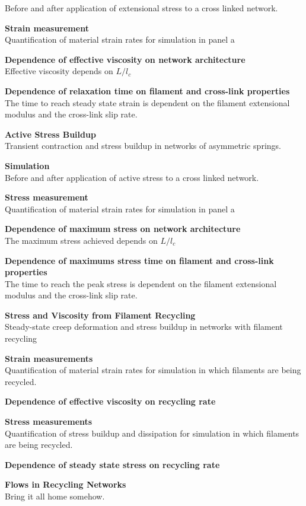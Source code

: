 \documentclass{report}
\begin{document}
\begin{outline}
\begin{outline}
\begin{outline}
\begin{outline}
	   Before and after application of extensional stress to a cross linked network.
	\item {\bf Strain measurement } \\
	   Quantification of material strain rates for simulation in panel a
	\item {\bf Dependence of effective viscosity on network architecture } \\
	   Effective viscosity depends on $L/l_c$ 
	\item {\bf Dependence of relaxation time on filament and cross-link properties } \\
	   The time to reach steady state strain is dependent on the filament extensional modulus and the cross-link slip rate.
      \end{outline}
      \item {\bf Active Stress Buildup } \\
	Transient contraction and stress buildup in networks of asymmetric springs.
      \begin{outline}
	\item {\bf Simulation } \\
	   Before and after application of active stress to a cross linked network.
	\item {\bf Stress measurement } \\
	   Quantification of material strain rates for simulation in panel a
	\item {\bf Dependence of maximum stress on network architecture } \\
	   The maximum stress achieved depends on $L/l_c$ 
	\item {\bf Dependence of maximums stress time on filament and cross-link properties } \\
	   The time to reach the peak stress is dependent on the filament extensional modulus and the cross-link slip rate.
      \end{outline}
      \item {\bf Stress and Viscosity from Filament Recycling} \\
	Steady-state creep deformation and stress buildup in networks with filament recycling
      \begin{outline}
	\item {\bf Strain measurements } \\
	   Quantification of material strain rates for simulation in which filaments are being recycled.
	\item {\bf Dependence of effective viscosity on recycling rate } 
	\item {\bf Stress measurements } \\
	   Quantification of stress buildup and dissipation for simulation in which filaments are being recycled.
	\item {\bf Dependence of steady state stress on recycling rate } 	
      \end{outline}
      \item {\bf Flows in Recycling Networks } \\
	Bring it all home somehow.
    \end{outline}
  \end{outline}
\end{outline}
\end{document}
